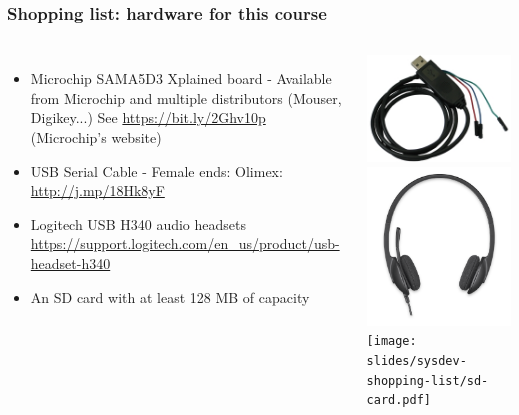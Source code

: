 \begin{frame}
\frametitle{Shopping list: hardware for this course}
  \begin{columns}
    \footnotesize
    \begin{itemize}
      \item Microchip SAMA5D3 Xplained board - Available from Microchip and
 	    multiple distributors (Mouser, Digikey...)
	    See \url{https://bit.ly/2Ghv10p} (Microchip's website)
      \item USB Serial Cable - Female ends:
	    Olimex: \url{http://j.mp/18Hk8yF} \\
      \item Logitech USB H340 audio headsets
	    \url{https://support.logitech.com/en_us/product/usb-headset-h340}
      \item An SD card with at least 128 MB of capacity
    \end{itemize}
    \includegraphics[height=0.20\textheight]{slides/sysdev-shopping-list/usb-serial-cable-female.png} \\
    \includegraphics[height=0.15\textheight]{slides/sysdev-shopping-list/logitech-h340.png} \\
    \texttt{[image: slides/sysdev-shopping-list/sd-card.pdf]}
  \end{columns}
\end{frame}
